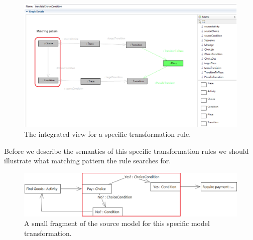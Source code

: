 \begin{figure}[H]
	\centering
	\includegraphics[scale=0.5]{./Figures/translateChoiceCondition.png}
	\caption[Integrated view for the DPF Transformation Editor]
	{The integrated view for a specific transformation rule.}
	\label{fig:integratedView_rule}
\end{figure}

Before we describe the semantics of this specific transformation rules we should
illustrate what matching pattern the rule searches for.

\begin{figure}[H]
	\centering
	\includegraphics[scale=0.5]{./Figures/isntanceExmaple.png}
	\caption[Small fragment of the source model]
	{A small fragment of the source model for this specific model transformation.}
	\label{fig:fragment_instance}
\end{figure}



